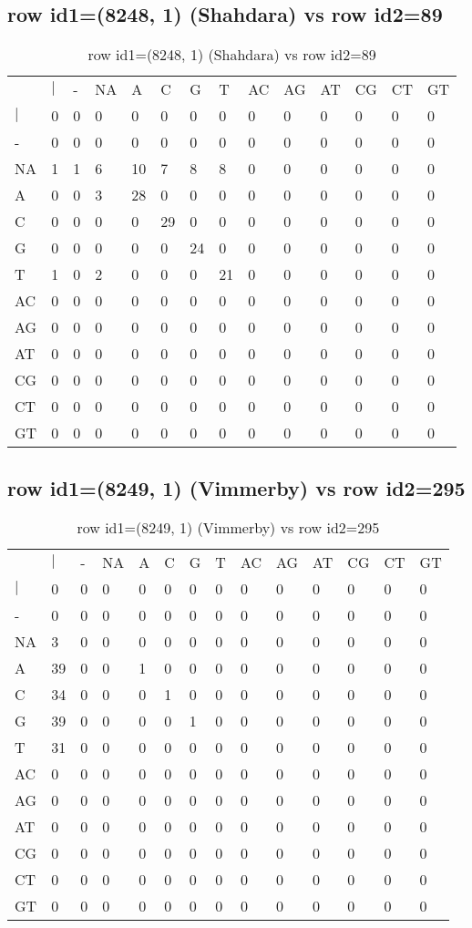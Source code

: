 \subsection{row id1=(8248, 1) (Shahdara) vs row id2=89}
\begin{center}
\begin{longtable}{|l|l|l|l|l|l|l|l|l|l|l|l|l|l|}
\caption{row id1=(8248, 1) (Shahdara) vs row id2=89} \label{table_dm382}\\
\hline
\\
\hline
&$|$&-&NA&A&C&G&T&AC&AG&AT&CG&CT&GT\\
$|$&0&0&0&0&0&0&0&0&0&0&0&0&0\\
-&0&0&0&0&0&0&0&0&0&0&0&0&0\\
NA&1&1&6&10&7&8&8&0&0&0&0&0&0\\
A&0&0&3&28&0&0&0&0&0&0&0&0&0\\
C&0&0&0&0&29&0&0&0&0&0&0&0&0\\
G&0&0&0&0&0&24&0&0&0&0&0&0&0\\
T&1&0&2&0&0&0&21&0&0&0&0&0&0\\
AC&0&0&0&0&0&0&0&0&0&0&0&0&0\\
AG&0&0&0&0&0&0&0&0&0&0&0&0&0\\
AT&0&0&0&0&0&0&0&0&0&0&0&0&0\\
CG&0&0&0&0&0&0&0&0&0&0&0&0&0\\
CT&0&0&0&0&0&0&0&0&0&0&0&0&0\\
GT&0&0&0&0&0&0&0&0&0&0&0&0&0\\
\hline
\end{longtable}
\end{center}

\subsection{row id1=(8249, 1) (Vimmerby) vs row id2=295}
\begin{center}
\begin{longtable}{|l|l|l|l|l|l|l|l|l|l|l|l|l|l|}
\caption{row id1=(8249, 1) (Vimmerby) vs row id2=295} \label{table_dm384}\\
\hline
\\
\hline
&$|$&-&NA&A&C&G&T&AC&AG&AT&CG&CT&GT\\
$|$&0&0&0&0&0&0&0&0&0&0&0&0&0\\
-&0&0&0&0&0&0&0&0&0&0&0&0&0\\
NA&3&0&0&0&0&0&0&0&0&0&0&0&0\\
A&39&0&0&1&0&0&0&0&0&0&0&0&0\\
C&34&0&0&0&1&0&0&0&0&0&0&0&0\\
G&39&0&0&0&0&1&0&0&0&0&0&0&0\\
T&31&0&0&0&0&0&0&0&0&0&0&0&0\\
AC&0&0&0&0&0&0&0&0&0&0&0&0&0\\
AG&0&0&0&0&0&0&0&0&0&0&0&0&0\\
AT&0&0&0&0&0&0&0&0&0&0&0&0&0\\
CG&0&0&0&0&0&0&0&0&0&0&0&0&0\\
CT&0&0&0&0&0&0&0&0&0&0&0&0&0\\
GT&0&0&0&0&0&0&0&0&0&0&0&0&0\\
\hline
\end{longtable}
\end{center}

